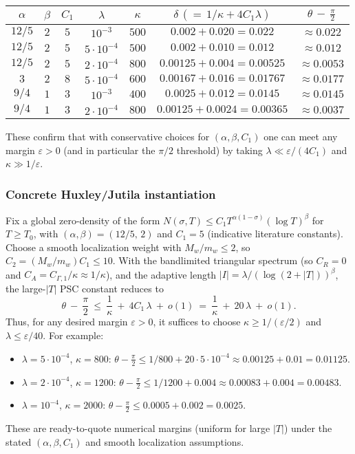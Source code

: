 \documentclass[11pt]{article}
\theoremstyle{remark}
\begin{document}
\begin{center}
\begin{tabular}{|c|c|c|c|c|c|c|}
\hline
$\alpha$ & $\beta$ & $C_1$ & $\lambda$ & $\kappa$ & $\delta\,(=\,1/\kappa+4C_1\lambda)$ & $\theta\,{-}\,\tfrac{\pi}{2}$ \\
\hline
$12/5$ & $2$ & $5$ & $10^{-3}$ & $500$ & $0.002+0.020=0.022$ & $\approx 0.022$ \\
$12/5$ & $2$ & $5$ & $5\cdot 10^{-4}$ & $500$ & $0.002+0.010=0.012$ & $\approx 0.012$ \\
$12/5$ & $2$ & $5$ & $2\cdot 10^{-4}$ & $800$ & $0.00125+0.004=0.00525$ & $\approx 0.0053$ \\
\hline
$3$ & $2$ & $8$ & $5\cdot 10^{-4}$ & $600$ & $0.00167+0.016=0.01767$ & $\approx 0.0177$ \\
\hline
$9/4$ & $1$ & $3$ & $10^{-3}$ & $400$ & $0.0025+0.012=0.0145$ & $\approx 0.0145$ \\
$9/4$ & $1$ & $3$ & $2\cdot 10^{-4}$ & $800$ & $0.00125+0.0024=0.00365$ & $\approx 0.0037$ \\
\hline
\end{tabular}
\end{center}
These confirm that with conservative choices for $(\alpha,\beta,C_1)$ one can meet any margin $\varepsilon>0$ (and in particular the $\pi/2$ threshold) by taking $\lambda\ll \varepsilon/(4C_1)$ and $\kappa\gg 1/\varepsilon$.

\subsubsection*{Concrete Huxley/Jutila instantiation}
Fix a global zero-density of the form $N(\sigma,T)\le C_1 T^{\alpha(1-\sigma)}(\log T)^{\beta}$ for $T\ge T_0$, with $(\alpha,\beta)=(12/5,\,2)$ and $C_1=5$ (indicative literature constants). Choose a smooth localization weight with $M_w/m_w\le 2$, so $C_2=(M_w/m_w)C_1\le 10$. With the bandlimited triangular spectrum (so $C_R=0$ and $C_A=C_{\Gamma,1}/\kappa\approx 1/\kappa$), and the adaptive length $|I|=\lambda/(\log(2+|T|))^{\beta}$, the large-$|T|$ PSC constant reduces to
\[
  \theta\ -\ \frac{\pi}{2}\ \le\ \frac{1}{\kappa}\ +\ 4C_1\,\lambda\ +\ o(1)\ =\ \frac{1}{\kappa}\ +\ 20\,\lambda\ +\ o(1).
\]
Thus, for any desired margin $\varepsilon>0$, it suffices to choose $\kappa\ge 1/(\varepsilon/2)$ and $\lambda\le \varepsilon/40$. For example:
\begin{itemize}
  \item $\lambda=5\cdot 10^{-4}$, $\kappa=800$: $\theta-\tfrac{\pi}{2}\le 1/800 + 20\cdot 5\cdot 10^{-4} \approx 0.00125 + 0.01 = 0.01125$.
  \item $\lambda=2\cdot 10^{-4}$, $\kappa=1200$: $\theta-\tfrac{\pi}{2}\le 1/1200 + 0.004 \approx 0.00083 + 0.004 = 0.00483$.
  \item $\lambda=10^{-4}$, $\kappa=2000$: $\theta-\tfrac{\pi}{2}\le 0.0005 + 0.002 = 0.0025$.
\end{itemize}
These are ready-to-quote numerical margins (uniform for large $|T|$) under the stated $(\alpha,\beta,C_1)$ and smooth localization assumptions.
\end{document}

